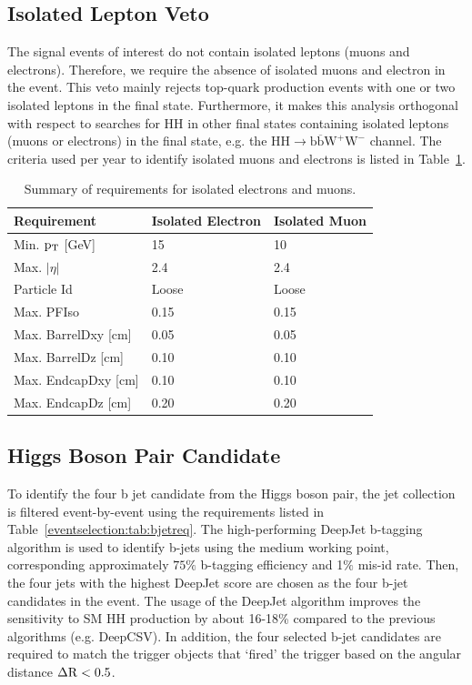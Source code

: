 \subsection{Isolated Lepton Veto} \label{subsec:leptonveto}
The signal events of interest do not contain isolated leptons (muons and electrons). Therefore, we require the absence of isolated muons and electron in the event. This veto mainly rejects top-quark production events with one or two isolated leptons in the final state. Furthermore, it makes this analysis orthogonal with respect to searches for HH in other final states containing isolated leptons (muons or electrons) in the final state, e.g. the $\mathrm{HH}\rightarrow\mathrm{b\overline{b}W^{+}W^{-}}$ channel. The criteria used per year to identify isolated muons and electrons is listed in Table~\ref{event_selection:tab:veto}.

\begin{table}[htb]
\caption[Summary of requirements for isolated electrons and muons]{\label{event_selection:tab:veto} Summary of requirements for isolated electrons and muons.}
\centering
\begin{tabularx}{\textwidth}{XXX}
	\hline
	Requirement & Isolated Electron & Isolated Muon\\
	\hline
	Min. $\mathrm{p_{T}}$ [GeV]            & 15   &  10  \\
	Max. $|\eta|$               & 2.4  &  2.4 \\
	Particle Id                 & Loose&Loose \\
	Max. PFIso                  & 0.15 & 0.15 \\
	Max. BarrelDxy [cm]         & 0.05 & 0.05 \\
	Max. BarrelDz  [cm]         & 0.10 & 0.10 \\
	Max. EndcapDxy [cm]         & 0.10 & 0.10 \\
	Max. EndcapDz  [cm]         & 0.20 & 0.20 \\
	\hline
\end{tabularx}
\end{table}

\subsection{Higgs Boson Pair Candidate} \label{subsec:hhpair}
To identify the four b jet candidate from the Higgs boson pair, the jet collection is filtered event-by-event using the requirements listed in Table~\ref{eventselection:tab:bjetreq}. The high-performing DeepJet b-tagging algorithm is used to identify b-jets using the medium working point, corresponding approximately $75\%$ b-tagging efficiency and 1$\%$ mis-id rate. Then, the four jets with the highest DeepJet score are chosen as the four b-jet candidates in the event. The usage of the DeepJet algorithm improves the sensitivity to SM HH production by about 16-18\% compared to the previous algorithms (e.g. DeepCSV). In addition, the four selected b-jet candidates are required to match the trigger objects that `fired' the trigger based on the angular distance $\mathrm{\Delta R}<0.5$.

